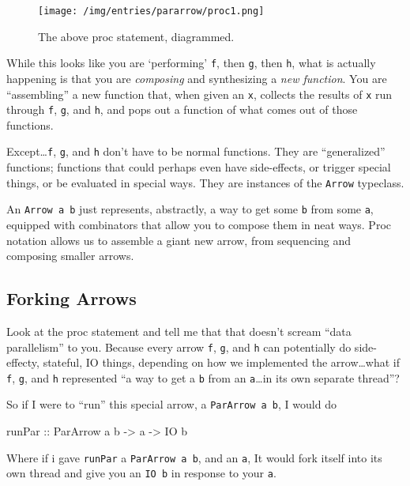 \documentclass[]{article}
\newenvironment{Shaded}{}{}
\newcommand{\DataTypeTok}[1]{\textcolor[rgb]{0.56,0.13,0.00}{#1}}
\newcommand{\NormalTok}[1]{#1}
\newcommand{\OtherTok}[1]{\textcolor[rgb]{0.00,0.44,0.13}{#1}}
\begin{document}
\begin{figure}
\centering
\texttt{[image: /img/entries/pararrow/proc1.png]}
\caption{The above proc statement, diagrammed.}
\end{figure}

While this looks like you are `performing' \texttt{f}, then \texttt{g}, then
\texttt{h}, what is actually happening is that you are \emph{composing} and
synthesizing a \emph{new function}. You are ``assembling'' a new function that,
when given an \texttt{x}, collects the results of \texttt{x} run through
\texttt{f}, \texttt{g}, and \texttt{h}, and pops out a function of what comes
out of those functions.

Except\ldots{}\texttt{f}, \texttt{g}, and \texttt{h} don't have to be normal
functions. They are ``generalized'' functions; functions that could perhaps even
have side-effects, or trigger special things, or be evaluated in special ways.
They are instances of the \texttt{Arrow} typeclass.

An \texttt{Arrow\ a\ b} just represents, abstractly, a way to get some
\texttt{b} from some \texttt{a}, equipped with combinators that allow you to
compose them in neat ways. Proc notation allows us to assemble a giant new
arrow, from sequencing and composing smaller arrows.

\subsection{Forking Arrows}\label{forking-arrows}

Look at the proc statement and tell me that that doesn't scream ``data
parallelism'' to you. Because every arrow \texttt{f}, \texttt{g}, and \texttt{h}
can potentially do side-effecty, stateful, IO things, depending on how we
implemented the arrow\ldots what if \texttt{f}, \texttt{g}, and \texttt{h}
represented ``a way to get a \texttt{b} from an \texttt{a}\ldots in its own
separate thread''?

So if I were to ``run'' this special arrow, a \texttt{ParArrow\ a\ b}, I would
do

\begin{Shaded}
\begin{Highlighting}[]
\OtherTok{runPar ::} \DataTypeTok{ParArrow}\NormalTok{ a b }\OtherTok{{-}\textgreater{}}\NormalTok{ a }\OtherTok{{-}\textgreater{}} \DataTypeTok{IO}\NormalTok{ b}
\end{Highlighting}
\end{Shaded}

Where if i gave \texttt{runPar} a \texttt{ParArrow\ a\ b}, and an \texttt{a}, It
would fork itself into its own thread and give you an \texttt{IO\ b} in response
to your \texttt{a}.
\end{document}
